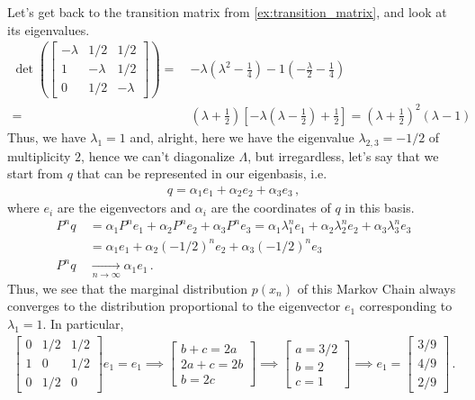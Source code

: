 Let's get back to the transition matrix from \cref{ex:transition_matrix}, and look at its eigenvalues.
\begin{align}
    \det\left(
    \begin{bmatrix}
    -\lambda & 1/2 & 1/2\\
    1 & -\lambda & 1/2\\
    0 & 1/2 & -\lambda
    \end{bmatrix} \right) =~& 
    -\lambda\left(\lambda^2 - \frac{1}{4}\right) - 1\left(-\frac{\lambda}{2} - \frac{1}{4}\right)\\
    =~& \left(\lambda + \frac{1}{2}\right)\left[-\lambda\left(\lambda - \frac{1}{2}\right) + \frac{1}{2}\right]
    = \left(\lambda + \frac{1}{2}\right)^2(\lambda - 1)
\end{align}
Thus, we have $\lambda_1 = 1$ and, alright, here we have the eigenvalue $\lambda_{2,3}=-1/2$ of multiplicity $2$, hence we can't diagonalize $\Lambda$, but irregardless, let's say that we start from $q$ that can be represented in our eigenbasis, i.e.
\begin{align}
    q = \alpha_1 e_1 + \alpha_2 e_2 + \alpha_3 e_3\,,
\end{align}
where $e_i$ are the eigenvectors and $\alpha_i$ are the coordinates of $q$ in this basis.
\begin{align}
    P^n q ~&= \alpha_1 P^n e_1 + \alpha_2 P^n e_2 + \alpha_3 P^n e_3 = \alpha_1 \lambda_1^n e_1 + \alpha_2 \lambda_2^n e_2 + \alpha_3 \lambda_3^n e_3\\
    ~&= \alpha_1 e_1 + \alpha_2 (-1/2)^n e_2 + \alpha_3 (-1/2)^n e_3\\
    P^n q ~&\xrightarrow[n\to\infty]{} \alpha_1 e_1\,.
\end{align}
Thus, we see that the marginal distribution $p(x_n)$ of this Markov Chain always converges to the distribution proportional to the eigenvector $e_1$ corresponding to $\lambda_1 = 1$. In particular, 
\begin{align}
    \begin{bmatrix}
    0 & 1/2 & 1/2\\
    1 & 0 & 1/2\\
    0 & 1/2 & 0
    \end{bmatrix}
    e_1 = e_1 \implies 
    \begin{bmatrix}
    b + c = 2a\\
    2a + c = 2b\\
    b = 2c
    \end{bmatrix}
    \implies 
    \begin{bmatrix}
    a = 3/2\\
    b = 2\\
    c = 1
    \end{bmatrix}
    \implies
    e_1 =
    \begin{bmatrix}
    3/9\\
    4/9\\
    2/9
    \end{bmatrix}\,.
\end{align}
